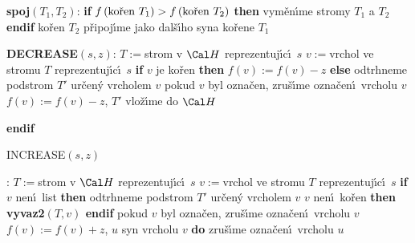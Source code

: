 {\bf spoj$\left(T_1,T_2\right)$}:\newline 
{\bf if} $f\left(\text{\rm ko\v ren }T_1\right)>f\left(\text{\rm ko\v ren }T_2\right)$ {\bf then}\newline 
\phantom{---}vym\v en\'\i me stromy $T_1$ a $T_2$\newline 
{\bf endif}\newline 
ko\v ren $T_2$ p\v ripoj\'\i me jako dal\v s\'\i ho syna ko\v rene $
T_1$
\bigskip

{\bf DECREASE$\left(s,z\right)$}:\newline 
$T:=$strom v $\Cal H$ reprezentuj\'\i c\'\i\ $s$\newline 
$v:=$vrchol ve stromu $T$ reprezentuj\'\i c\'\i\ $s$\newline 
{\bf if} $v$ je ko\v ren {\bf then}\newline 
\phantom{---}$f\left(v\right):=f\left(v\right)-z$\newline 
{\bf else\newline}
\phantom{---}odtrhneme podstrom $T'$ ur\v cen\'y vrcholem $v$\newline 
\phantom{---}{\bf vyvaz2$\left(T,v\right)$\newline}
\phantom{---}pokud $v$ byl ozna\v cen, zru\v s\'\i me ozna\v cen\'\i\ vrcholu $
v$\newline 
\phantom{---}$f\left(v\right):=f\left(v\right)-z$, $T'$ vlo\v z\'\i me do $\Cal H$\newline 
{\bf endif
\bigskip

INCREASE$\left(s,z\right)$}:\newline 
$T:=$strom v $\Cal H$ reprezentuj\'\i c\'\i\ $s$\newline 
$v:=$vrchol ve stromu $T$ reprezentuj\'\i c\'\i\ $s$\newline 
{\bf if} $v$ nen\'\i\ list {\bf then\newline}
\phantom{---}odtrhneme podstrom $T'$ ur\v cen\'y vrcholem $v$\newline 
\phantom{---}{\bf if} $v$ nen\'\i\ ko\v ren {\bf then vyvaz2$\left(T,v\right)$ endif\newline}
\phantom{---}pokud $v$ byl ozna\v cen, zru\v s\'\i me ozna\v cen\'\i\ vrcholu $
v$\newline 
\phantom{---}$f\left(v\right):=f\left(v\right)+z$,\newline 
\phantom{---}{\bf for every} $u$ syn vrcholu $v$ {\bf do\newline}
\phantom{------}zru\v s\'\i me ozna\v cen\'\i\ vrcholu $u$ \newline 
